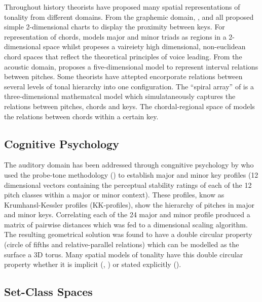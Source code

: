\documentclass{article}
\begin{document}
Throughout history theorists have proposed many spatial
representations of tonality from different domains. From the graphemic
domain, \citep{Heinichen1728}, \citep{Webber1817} and
\citep{Schoenberg1948} all proposed simple 2-dimensional charts to
display the proximity between keys. For representation of chords,
\citep{Riemann} models major and minor triads as regions in a
2-dimensional space whilst \citep{Tymoczko2011} propeses a vaireiety
high dimensional, non-euclidean chord spaces that reflect the
theoretical principles of voice leading. From the acoustic domain,
\citep{Shepard1982} proposes a five-dimensional model to represent
interval relations between pitches. Some theorists have attepted
encorporate relations between several levels of tonal hierarchy into
one configuration. The ``spiral array'' of \citep{Chew2000} is a
three-dimensional mathematcal model which simulataneously captures the
relations between pitches, chords and keys. The chordal-regional space
of \citep{Lerdahl2001} models the relations between chords within a
certain key.
\subsection{Cognitive Psychology}
\label{sec-5-3}

The auditory domain has been addressed through congnitive psychology
by \citep{Krumhansl1990} who used the probe-tone methodology
(\citep{Krumhansl1979}) to establish major and minor key profiles (12
dimensional vectors containing the perceptual stability ratings of
each of the 12 pitch classes within a major or minor context). These
profiles, know as Krumhansl-Kessler profiles (KK-profiles), show the
hierarchy of pitches in major and minor keys. Correlating each of the
24 major and minor profile produced a matrix of pairwise distances
which was fed to a dimensional scaling algorithm. The resulting
geometrical solution was found to have a double circular property
(circle of fifths and relative-parallel relations) which can be
modelled as the surface a 3D torus. Many spatial models of tonality
have this double circular property whether it is implicit
(\citep{Weber1821}, \citep{Schoenberg1948}) or stated explicitly
(\citep{Lerdahl2001}).
\subsection{Set-Class Spaces}
\label{sec-5-4}
\end{document}
